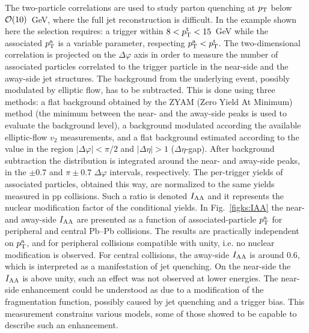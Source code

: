 The two-particle correlations are used to study parton quenching at $p_{\rm T}$ below ${\cal O}(10)$~GeV, where the full jet reconstruction is difficult. In the example shown here the selection requires: a trigger within $8 < p_{\rm T}^{\rm t} < 15$~GeV while the associated $p_{\rm T}^{\rm a}$ is a variable parameter, respecting $p_{\rm T}^{\rm a} <p_{\rm T}^{\rm t}$. The two-dimensional correlation is projected on the $\Delta\varphi$ axis in order to measure the number of associated particles correlated to the trigger particle in the near-side and the away-side jet structures. The background from the underlying event, possibly modulated by elliptic flow, has to be subtracted. This is done using three methods: a flat background obtained by the ZYAM (Zero Yield At Minimum) method (the minimum between the near- and the away-side peaks is used to evaluate the background level), a background modulated according the available elliptic-flow $v_2$ measurements, and a flat background estimated according to the value in the region $|\Delta\varphi| < \pi/2$ and $|\Delta\eta| > 1$  ($\Delta\eta$-gap). After background subtraction the distribution is integrated around the near- and away-side peaks, in the $\pm 0.7$ and $\pi \pm 0.7$ $\Delta\varphi$ intervals, respectively. The per-trigger yields of associated particles, obtained this way, are normalized to the same yields measured in pp collisions. Such a ratio is denoted $I_{\rm AA}$ and it represents the nuclear modification factor of the conditional yields. In Fig.~\ref{figks:IAA} the near- and away-side $I_{\rm AA}$ are presented as a function of associated-particle $p_{\rm T}^{\rm a}$ for peripheral and central Pb--Pb collisions. The results are practically independent on $p_{\rm T}^{\rm a}$, and for peripheral collisions compatible with unity, i.e. no nuclear modification is observed. For central collisions, the away-side $I_{\rm AA}$ is around 0.6, which is interpreted as a manifestation of jet quenching. On the near-side the $I_{\rm AA}$ is above unity, such an effect was not observed at lower energies. The near-side enhancement could be understood as due to a modification of the fragmentation function, possibly caused by jet quenching and a trigger bias. This measurement constrains various models, some of those showed to be capable to describe such an enhancement.

